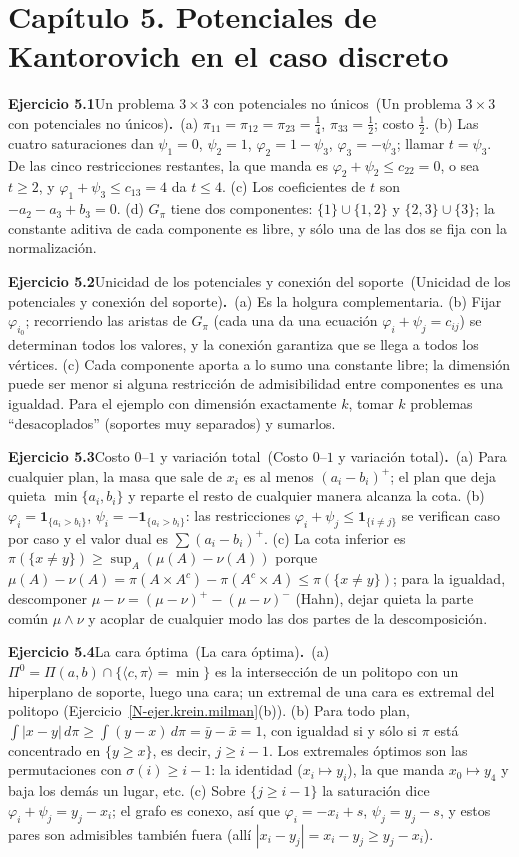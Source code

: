 \documentclass[11pt,a4paper]{amsart}
\newcommand{\I}{{\mathbf 1}}
\theoremstyle{remark}
\theoremstyle{definition}
\numberwithin{subsection}{section}
\numberwithin{equation}{section}
\newcommand{\ejlabel}[2]{\par\medskip\noindent\textbf{Ejercicio #1}\ifx\relax#2\relax\else\ (#2)\fi\textbf{.}\ }
\begin{document}
\section*{Capítulo 5. Potenciales de Kantorovich en el caso discreto}
\ejlabel{5.1}{Un problema $3\times3$ con potenciales no únicos}(a) $\pi_{11}=\pi_{12}=\pi_{23}=\tfrac14$, $\pi_{33}=\tfrac12$; costo $\tfrac12$. (b) Las cuatro saturaciones dan $\psi_1=0$, $\psi_2=1$, $\varphi_2=1-\psi_3$, $\varphi_3=-\psi_3$; llamar $t=\psi_3$. De las cinco restricciones restantes, la que manda es $\varphi_2+\psi_2\le c_{22}=0$, o sea $t\ge2$, y $\varphi_1+\psi_3\le c_{13}=4$ da $t\le4$. (c) Los coeficientes de $t$ son $-a_2-a_3+b_3=0$. (d) $G_\pi$ tiene dos componentes: $\{1\}\cup\{1,2\}$ y $\{2,3\}\cup\{3\}$; la constante aditiva de cada componente es libre, y sólo una de las dos se fija con la normalización.

\ejlabel{5.2}{Unicidad de los potenciales y conexión del soporte}(a) Es la holgura complementaria. (b) Fijar $\varphi_{i_0}$; recorriendo las aristas de $G_\pi$ (cada una da una ecuación $\varphi_i+\psi_j=c_{ij}$) se determinan todos los valores, y la conexión garantiza que se llega a todos los vértices. (c) Cada componente aporta a lo sumo una constante libre; la dimensión puede ser menor si alguna restricción de admisibilidad entre componentes es una igualdad. Para el ejemplo con dimensión exactamente $k$, tomar $k$ problemas ``desacoplados'' (soportes muy separados) y sumarlos.

\ejlabel{5.3}{Costo $0$--$1$ y variación total}(a) Para cualquier plan, la masa que sale de $x_i$ es al menos $(a_i-b_i)^+$; el plan que deja quieta $\min\{a_i,b_i\}$ y reparte el resto de cualquier manera alcanza la cota. (b) $\varphi_i=\I_{\{a_i>b_i\}}$, $\psi_i=-\I_{\{a_i>b_i\}}$: las restricciones $\varphi_i+\psi_j\le\I_{\{i\ne j\}}$ se verifican caso por caso y el valor dual es $\sum(a_i-b_i)^+$. (c) La cota inferior es $\pi(\{x\ne y\})\ge\sup_A(\mu(A)-\nu(A))$ porque $\mu(A)-\nu(A)=\pi(A\times A^c)-\pi(A^c\times A)\le\pi(\{x\ne y\})$; para la igualdad, descomponer $\mu-\nu=(\mu-\nu)^+-(\mu-\nu)^-$ (Hahn), dejar quieta la parte común $\mu\wedge\nu$ y acoplar de cualquier modo las dos partes de la descomposición.

\ejlabel{5.4}{La cara óptima}(a) $\Pi^0=\Pi(a,b)\cap\{\langle c,\pi\rangle=\min\}$ es la intersección de un politopo con un hiperplano de soporte, luego una cara; un extremal de una cara es extremal del politopo (Ejercicio~\ref{N-ejer.krein.milman}(b)). (b) Para todo plan, $\int|x-y|\,d\pi\ge\int(y-x)\,d\pi=\bar y-\bar x=1$, con igualdad si y sólo si $\pi$ está concentrado en $\{y\ge x\}$, es decir, $j\ge i-1$. Los extremales óptimos son las permutaciones con $\sigma(i)\ge i-1$: la identidad ($x_i\mapsto y_i$), la que manda $x_0\mapsto y_4$ y baja los demás un lugar, etc. (c) Sobre $\{j\ge i-1\}$ la saturación dice $\varphi_i+\psi_j=y_j-x_i$; el grafo es conexo, así que $\varphi_i=-x_i+s$, $\psi_j=y_j-s$, y estos pares son admisibles también fuera (allí $|x_i-y_j|=x_i-y_j\ge y_j-x_i$).
\end{document}
